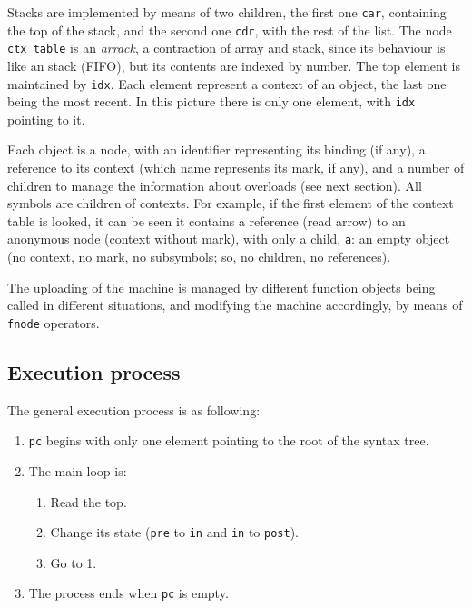 \documentclass{article}
\begin{document}
Stacks are implemented by means of two children, the first one \texttt{car},
containing the top of the stack, and the second one \texttt{cdr}, with the rest
of the list. The node \texttt{ctx\_table} is an \textit{arrack}, a contraction of
array and stack, since its behaviour is like an stack (FIFO), but its contents
are indexed by number. The top element is maintained by \texttt{idx}. Each
element represent a context of an object, the last one being the most recent. In
this picture there is only one element, with \texttt{idx} pointing to it.

Each \faupp object is a node, with an identifier representing its binding (if
any), a reference to its context (which name represents its mark, if any), and a
number of children to manage the information about overloads (see next section). All
symbols are children of contexts. For example, if the first element of the
context table is looked, it can be seen it contains a reference (read arrow) to
an anonymous node (context without mark), with only a child, \texttt{a}: an
empty object (no context, no mark, no subsymbols; so, no children, no
references).

The uploading of the machine is managed by different function objects being
called in different situations, and modifying the machine accordingly, by means
of \texttt{fnode} operators.

\subsection{Execution process}
\label{ssec:exec}
The general execution process is as following:

\begin{enumerate}
\item \texttt{pc} begins with only one element pointing to the root of the
  syntax tree.
\item The main loop is:

  \begin{enumerate}
  \item Read the top.
  \item Change its state (\texttt{pre} to \texttt{in} and \texttt{in} to
    \texttt{post}).
  \item Go to 1.
  \end{enumerate}

\item The process ends when \texttt{pc} is empty.

\end{enumerate}
\end{document}
